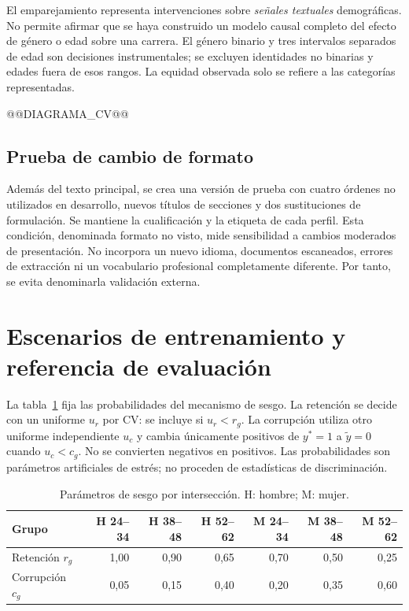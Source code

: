 El emparejamiento representa intervenciones sobre \emph{señales textuales} demográficas. No permite afirmar que se haya construido un modelo causal completo del efecto de género o edad sobre una carrera. El género binario y tres intervalos separados de edad son decisiones instrumentales; se excluyen identidades no binarias y edades fuera de esos rangos. La equidad observada solo se refiere a las categorías representadas.

@@DIAGRAMA_CV@@

\subsection{Prueba de cambio de formato}
Además del texto principal, se crea una versión de prueba con cuatro órdenes no utilizados en desarrollo, nuevos títulos de secciones y dos sustituciones de formulación. Se mantiene la cualificación y la etiqueta de cada perfil. Esta condición, denominada formato no visto, mide sensibilidad a cambios moderados de presentación. No incorpora un nuevo idioma, documentos escaneados, errores de extracción ni un vocabulario profesional completamente diferente. Por tanto, se evita denominarla validación externa.

\section{Escenarios de entrenamiento y referencia de evaluación}
La tabla~\ref{tab:probabilidades} fija las probabilidades del mecanismo de sesgo. La retención se decide con un uniforme $u_r$ por CV: se incluye si $u_r<r_g$. La corrupción utiliza otro uniforme independiente $u_c$ y cambia únicamente positivos de $y^*=1$ a $\tilde y=0$ cuando $u_c<c_g$. No se convierten negativos en positivos. Las probabilidades son parámetros artificiales de estrés; no proceden de estadísticas de discriminación.

\begin{table}[htbp]\centering\small
\caption{Parámetros de sesgo por intersección. H: hombre; M: mujer.}\label{tab:probabilidades}
\begin{tabular}{lrrrrrr}\toprule
Grupo & H 24--34&H 38--48&H 52--62&M 24--34&M 38--48&M 52--62\\\midrule
Retención $r_g$&1,00&0,90&0,65&0,70&0,50&0,25\\
Corrupción $c_g$&0,05&0,15&0,40&0,20&0,35&0,60\\\bottomrule
\end{tabular}\end{table}

